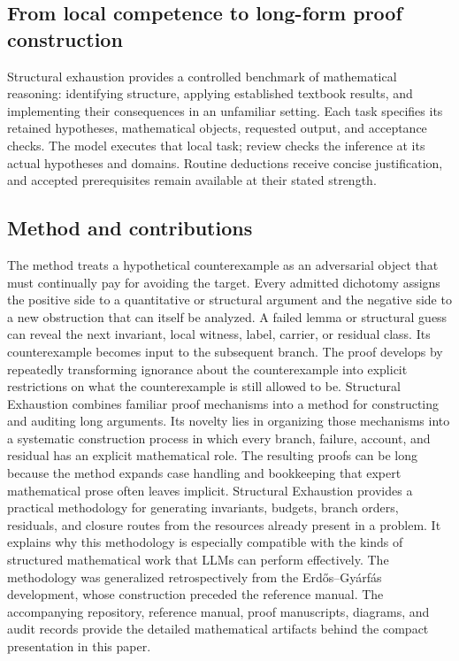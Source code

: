 \documentclass[11pt]{article}
\begin{document}
\subsection{From local competence to long-form proof construction}
Structural exhaustion provides a controlled benchmark of mathematical
reasoning: identifying structure, applying established textbook results, and
implementing their consequences in an unfamiliar setting. Each task specifies
its retained hypotheses, mathematical objects, requested output, and acceptance
checks. The model executes that local task; review checks the inference at its
actual hypotheses and domains. Routine deductions receive concise justification,
and accepted prerequisites remain available at their stated strength.

\subsection{Method and contributions}
The method treats a hypothetical counterexample as an adversarial object that must continually pay for avoiding the target.
Every admitted dichotomy assigns the positive side to a quantitative or structural argument and the negative side to a new obstruction that can itself be analyzed.
A failed lemma or structural guess can reveal the next invariant, local witness, label, carrier, or residual class. Its counterexample becomes input to the subsequent branch.
The proof develops by repeatedly transforming ignorance about the counterexample into explicit restrictions on what the counterexample is still allowed to be.
Structural Exhaustion combines familiar proof mechanisms into a method for constructing and auditing long arguments.
Its novelty lies in organizing those mechanisms into a systematic construction process in which every branch, failure, account, and residual has an explicit mathematical role.
The resulting proofs can be long because the method expands case handling and bookkeeping that expert mathematical prose often leaves implicit.
Structural Exhaustion provides a practical methodology for generating invariants, budgets, branch orders, residuals, and closure routes from the resources already present in a problem.
It explains why this methodology is especially compatible with the kinds of structured mathematical work that LLMs can perform effectively.
The methodology was generalized retrospectively from the Erdős–Gyárfás development, whose construction preceded the reference manual.
The accompanying repository, reference manual, proof manuscripts, diagrams, and audit records provide the detailed mathematical artifacts behind the compact presentation in this paper.
\end{document}
